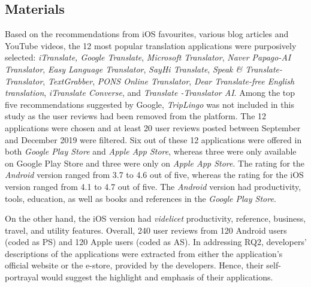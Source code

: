 \documentclass[english]{textolivre}
\begin{document}
\subsection{Materials}\label{sec-autores}
Based on the recommendations from iOS favourites, various blog articles and YouTube videos, the 12 most popular translation applications were purposively selected: \textit{iTranslate, Google Translate}, \textit{Microsoft Translator}, \textit{Naver Papago-AI Translator}, \textit{Easy Language Translator}, \textit{SayHi Translate}, \textit{Speak \& Translate-Translator}, \textit{TextGrabber}, \textit{PONS Online Translator}, \textit{Dear Translate-free English translation}, \textit{iTranslate Converse}, and \textit{Translate -Translator AI}. Among the top five recommendations suggested by Google, \textit{TripLingo} was not included in this study as the user reviews had been removed from the platform. The 12 applications were chosen and at least 20 user reviews posted between September and December 2019 were filtered. Six out of these 12 applications were offered in both \textit{Google Play Store} and \textit{Apple App Store}, whereas three were only available on Google Play Store and three were only on \textit{Apple App Store}. The rating for the \textit{Android} version ranged from 3.7 to 4.6 out of five, whereas the rating for the iOS version ranged from 4.1 to 4.7 out of five. The \textit{Android} version had productivity, tools, education, as well as books and references in the \textit{Google Play Store}.

On the other hand, the iOS version had \textit{videlicet} productivity, reference, business, travel, and utility features. Overall, 240 user reviews from 120 Android users (coded as PS) and 120 Apple users (coded as AS). In addressing RQ2, developers’ descriptions of the applications were extracted from either the application’s official website or the e-store, provided by the developers. Hence, their self-portrayal would suggest the highlight and emphasis of their applications.
\end{document}
